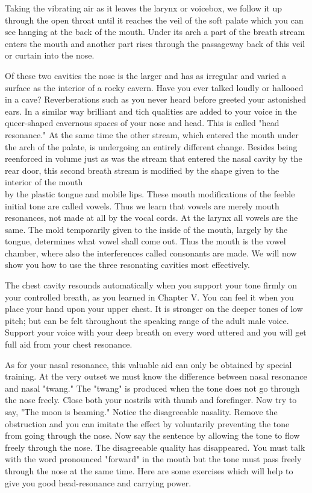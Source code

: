\documentclass[10pt]{article}
\begin{document}
Taking the vibrating air as it leaves the larynx or voicebox, we follow it up through the open throat until it reaches the veil of the soft palate which you can see hanging at the back of the mouth. Under its arch a part of the breath stream enters the mouth and another part rises through the passageway back of this veil or curtain into the nose.

Of these two cavities the nose is the larger and has as irregular and varied a surface as the interior of a rocky cavern. Have you ever talked loudly or hallooed in a cave? Reverberations such as you never heard before greeted your astonished ears. In a similar way brilliant and tich qualities are added to your voice in the queer-shaped cavernous spaces of your nose and head. This is called "head resonance." At the same time the other stream, which entered the mouth under the arch of the palate, is undergoing an entirely different change. Besides being reenforced in volume just as was the stream that entered the nasal cavity by the rear door, this second breath stream is modified by the shape given to the interior of the mouth\\
by the plastic tongue and mobile lips. These mouth modifications of the feeble initial tone are called vowels. Thus we learn that vowels are merely mouth resonances, not made at all by the vocal cords. At the larynx all vowels are the same. The mold temporarily given to the inside of the mouth, largely by the tongue, determines what vowel shall come out. Thus the mouth is the vowel chamber, where also the interferences called consonants are made. We will now show you how to use the three resonating cavities most effectively.

The chest cavity resounds automatically when you support your tone firmly on your controlled breath, as you learned in Chapter V. You can feel it when you place your hand upon your upper chest. It is stronger on the deeper tones of low pitch; but can be felt throughout the speaking range of the adult male voice. Support your voice with your deep breath on every word uttered and you will get full aid from your chest resonance.

As for your nasal resonance, this valuable aid can only be obtained by special training. At the very outset we must know the difference between nasal resonance and nasal "twang." The "twang" is produced when the tone does not go through the nose freely. Close both your nostrils with thumb and forefinger. Now try to say, "The moon is beaming." Notice the disagreeable nasality. Remove the obstruction and you can imitate the effect by voluntarily preventing the tone from going through the nose. Now say the sentence by allowing the tone to flow freely through the nose. The disagreeable quality has disappeared. You must talk with the word pronounced "forward" in the mouth but the tone must pass freely through the nose at the same time. Here are some exercises which will help to give you good head-resonance and carrying power.
\end{document}
